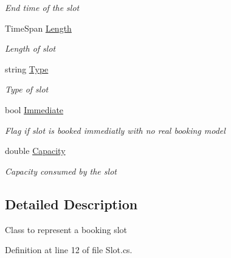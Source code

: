 \begin{DoxyCompactItemize}
\begin{DoxyCompactList}\small\item\em End time of the slot \end{DoxyCompactList}\item 
Time\+Span \hyperlink{class_general_health_care_elements_1_1_booking_models_1_1_slot_a7d8fb7d75d823021fdfbbca350b8a5ac}{Length}
\begin{DoxyCompactList}\small\item\em Length of slot \end{DoxyCompactList}\item 
string \hyperlink{class_general_health_care_elements_1_1_booking_models_1_1_slot_a4976b94bf83515589d1bc49de9cb7b0c}{Type}
\begin{DoxyCompactList}\small\item\em Type of slot \end{DoxyCompactList}\item 
bool \hyperlink{class_general_health_care_elements_1_1_booking_models_1_1_slot_a8044804ae9c27032f8e834092f4fe521}{Immediate}
\begin{DoxyCompactList}\small\item\em Flag if slot is booked immediatly with no real booking model \end{DoxyCompactList}\item 
double \hyperlink{class_general_health_care_elements_1_1_booking_models_1_1_slot_aa3e9b70d316fc5e1d24448c8d844a7a1}{Capacity}
\begin{DoxyCompactList}\small\item\em Capacity consumed by the slot \end{DoxyCompactList}\end{DoxyCompactItemize}


\subsection{Detailed Description}
Class to represent a booking slot 



Definition at line 12 of file Slot.\+cs.



